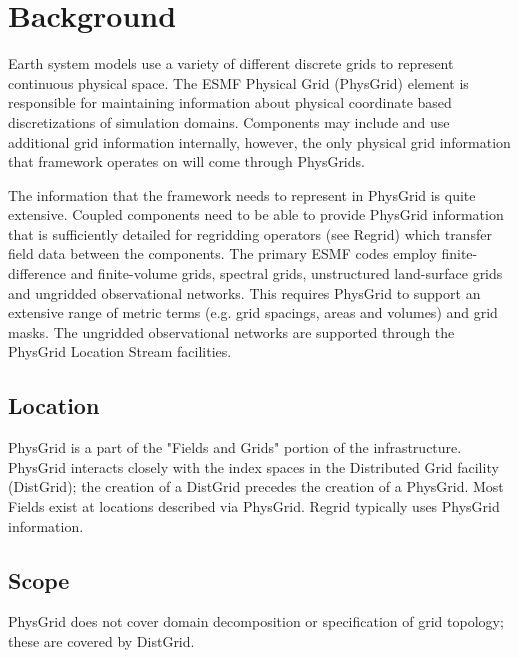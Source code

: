 
\section{Background}


  Earth system models use a variety of different discrete grids to represent
continuous physical space. The ESMF Physical Grid (PhysGrid) element is 
responsible for maintaining information about physical coordinate based 
discretizations of simulation domains. Components may include and use 
additional grid information internally, however, the only physical grid 
information that framework operates on will come through PhysGrids. 

  The information that the framework needs to represent in PhysGrid is  quite
extensive. Coupled components need to be able to provide PhysGrid  information
that is sufficiently detailed for regridding operators (see Regrid) which
transfer field data between the components.  The primary ESMF codes employ
finite-difference and finite-volume grids, spectral grids, unstructured
land-surface grids and ungridded observational networks.  This requires
PhysGrid to support an extensive range of metric terms (e.g. grid spacings,
areas and volumes) and grid masks.  The ungridded observational networks are
supported through the PhysGrid Location Stream facilities.

\subsection{Location}

  PhysGrid is a part of the "Fields and Grids" portion of the infrastructure.
PhysGrid interacts closely with the index spaces in the Distributed Grid
facility (DistGrid); the creation of a DistGrid precedes the creation of a
PhysGrid.  Most Fields exist at locations described via PhysGrid.  Regrid
typically uses PhysGrid information.

\subsection{Scope}

PhysGrid does not cover domain decomposition or specification of grid
topology; these are covered by DistGrid.









